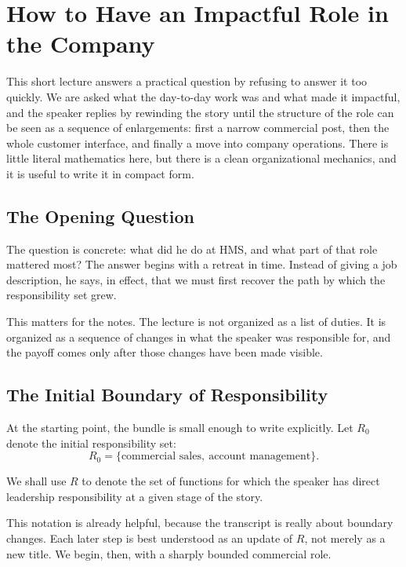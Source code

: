 \chapter{How to Have an Impactful Role in the Company}

This short lecture answers a practical question by refusing to answer it too quickly. We are asked what the day-to-day work was and what made it impactful, and the speaker replies by rewinding the story until the structure of the role can be seen as a sequence of enlargements: first a narrow commercial post, then the whole customer interface, and finally a move into company operations. There is little literal mathematics here, but there is a clean organizational mechanics, and it is useful to write it in compact form.

\section{The Opening Question}

The question is concrete: what did he do at HMS, and what part of that role mattered most? The answer begins with a retreat in time. Instead of giving a job description, he says, in effect, that we must first recover the path by which the responsibility set grew.

This matters for the notes. The lecture is not organized as a list of duties. It is organized as a sequence of changes in what the speaker was responsible for, and the payoff comes only after those changes have been made visible.

\section{The Initial Boundary of Responsibility}

At the starting point, the bundle is small enough to write explicitly. Let \(R_0\) denote the initial responsibility set:
\begin{equation}
R_0 = \{\text{commercial sales},\ \text{account management}\}.
\end{equation}

\begin{definition}
We shall use \(R\) to denote the set of functions for which the speaker has direct leadership responsibility at a given stage of the story.
\end{definition}

This notation is already helpful, because the transcript is really about boundary changes. Each later step is best understood as an update of \(R\), not merely as a new title. We begin, then, with a sharply bounded commercial role.

